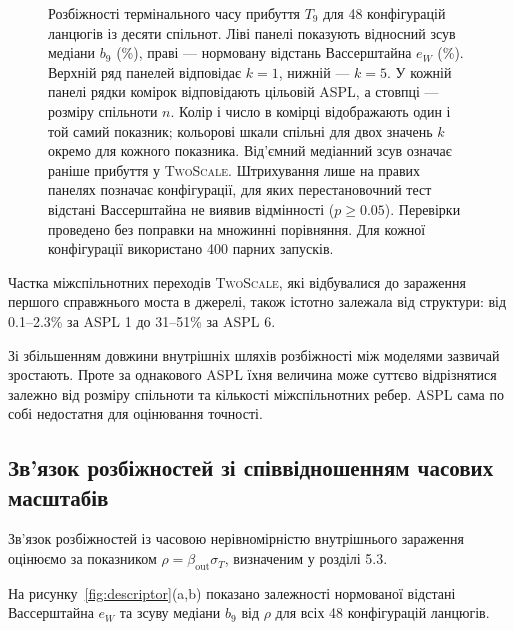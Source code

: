 \documentclass[a4paper,fleqn]{cas-sc}
\newcommand{\TS}{\textup{\textsc{TwoScale}}}
\newcommand{\eW}{e_{W}}
\begin{document}
\begin{figure}[tbp]
\caption{%
Розбіжності термінального часу
прибуття $T_9$ для 48 конфігурацій
ланцюгів із десяти спільнот.
Ліві панелі показують відносний зсув медіани
$b_9$ (\%), праві --- нормовану відстань
Вассерштайна $\eW$ (\%). Верхній ряд панелей
відповідає $k=1$, нижній --- $k=5$.
У кожній панелі рядки комірок відповідають
цільовій ASPL, а стовпці --- розміру спільноти $n$.
Колір і число в комірці відображають один і той самий
показник; кольорові шкали спільні для двох значень $k$
окремо для кожного показника.
Від'ємний медіанний зсув означає раніше прибуття у \TS{}.
Штрихування лише на правих панелях позначає
конфігурації, для яких перестановочний тест відстані
Вассерштайна не виявив відмінності ($p\geq0.05$).
Перевірки проведено без поправки
на множинні порівняння.
Для кожної конфігурації
використано 400 парних запусків.
}
\label{fig:accuracy_map}
\end{figure}

Частка міжспільнотних переходів
\TS{}, які відбувалися до зараження
першого справжнього моста в джерелі,
також істотно залежала від структури:
від 0.1--2.3\% за ASPL 1
до 31--51\% за ASPL 6.

Зі збільшенням довжини внутрішніх
шляхів розбіжності між моделями
зазвичай зростають. Проте за однакового
ASPL їхня величина може суттєво
відрізнятися залежно від розміру
спільноти та кількості міжспільнотних
ребер. ASPL сама по собі недостатня
для оцінювання точності.


\subsection{Зв'язок розбіжностей
зі співвідношенням часових масштабів}
\label{sec:res_descriptor}

Зв'язок розбіжностей із часовою нерівномірністю
внутрішнього зараження оцінюємо за показником
$\rho=\beta_{\mathrm{out}}\sigma_T$,
визначеним у розділі 5.3.

На рисунку~\ref{fig:descriptor}(a,b)
показано залежності нормованої
відстані Вассерштайна $\eW$
та зсуву медіани $b_9$
від $\rho$ для всіх
48 конфігурацій ланцюгів.
\end{document}
